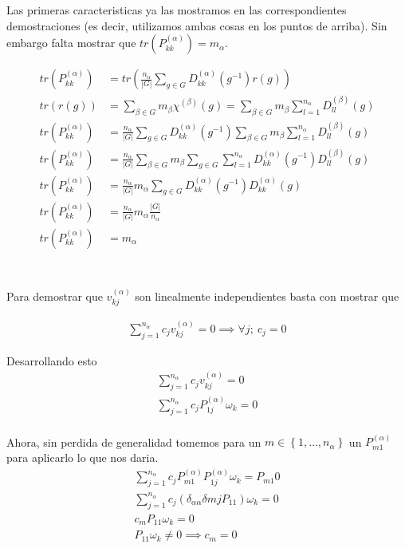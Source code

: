 \documentclass[12pt]{amsart}
\begin{document}
  Las primeras caracteristicas ya las mostramos en las correspondientes demostraciones (es decir, utilizamos ambas cosas en los puntos de arriba). Sin embargo falta mostrar que $tr(P_{kk}^{(\alpha)}) = m_\alpha$.

  \begin{align*}
    tr(P_{kk}^{(\alpha)}) &= tr\left(\frac{n_\alpha}{\left|G\right|} \sum_{g \in G} D_{kk}^{(\alpha)}(g^{-1}) r(g)\right)\\
    tr(r(g)) &= \sum_{\beta \in G} m_\beta \chi^{(\beta)}(g) = \sum_{\beta \in G} m_\beta \sum_{l = 1}^{n_\alpha} D_{ll}^{(\beta)}(g)\\
    tr(P_{kk}^{(\alpha)}) &= \frac{n_\alpha}{\left|G\right|} \sum_{g \in G} D_{kk}^{(\alpha)}(g^{-1}) \sum_{\beta \in G} m_\beta \sum_{l = 1}^{n_\alpha} D_{ll}^{(\beta)}(g)\\
    tr(P_{kk}^{(\alpha)}) &= \frac{n_\alpha}{\left|G\right|} \sum_{\beta \in G} m_\beta \sum_{g \in G}  \sum_{l = 1}^{n_\alpha} D_{kk}^{(\alpha)}(g^{-1}) D_{ll}^{(\beta)}(g)\\
    tr(P_{kk}^{(\alpha)}) &= \frac{n_\alpha}{\left|G\right|} m_\alpha \sum_{g \in G} D_{kk}^{(\alpha)}(g^{-1}) D_{kk}^{(\alpha)}(g)\\
    tr(P_{kk}^{(\alpha)}) &= \frac{n_\alpha}{\left|G\right|} m_\alpha \frac{\left|G\right|}{n_\alpha}\\
    tr(P_{kk}^{(\alpha)}) &= m_\alpha\\
  \end{align*}

  \section{}

  Para demostrar que $v_{kj}^{(\alpha)}$ son linealmente independientes basta con mostrar que

  \begin{align*}
    \sum_{j = 1}^{n_\alpha} c_jv_{kj}^{(\alpha)} = 0 \implies \forall j;\ c_j = 0
  \end{align*}

  Desarrollando esto
  \begin{align*}
    \sum_{j = 1}^{n_\alpha} c_jv_{kj}^{(\alpha)} = 0\\
    \sum_{j = 1}^{n_\alpha} c_jP_{1j}^{(\alpha)}\omega_k = 0\\
  \end{align*}

  Ahora, sin perdida de generalidad tomemos para un $m \in \left\{1, \ldots, n_\alpha \right\}$ un $P_{m1}^{(\alpha)}$ para aplicarlo lo que nos daria.
  \begin{align*}
    \sum_{j = 1}^{n_\alpha} c_jP_{m1}^{(\alpha)}P_{1j}^{(\alpha)}\omega_k = P_{m1}0\\
    \sum_{j = 1}^{n_\alpha} c_j\left(\delta_{\alpha\alpha}\delta{mj}P_{11}\right)\omega_k = 0\\
    c_m P_{11}\omega_k = 0\\
    P_{11}\omega_k \neq 0 \implies c_m = 0\\
  \end{align*}
\end{document}
